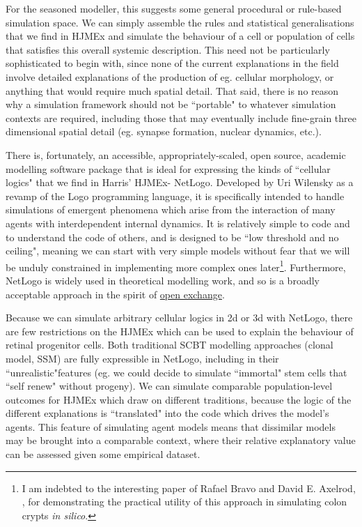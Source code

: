 For the seasoned modeller, this suggests some general procedural or rule-based simulation space. We can simply assemble the rules and statistical generalisations that we find in HJMEx and simulate the behaviour of a cell or population of cells that satisfies this overall systemic description. This need not be particularly sophisticated to begin with, since none of the current explanations in the field involve detailed explanations of the production of eg. cellular morphology, or anything that would require much spatial detail. That said, there is no reason why a simulation framework should not be ``portable" to whatever simulation contexts are required, including those that may eventually include fine-grain three dimensional spatial detail (eg. synapse formation, nuclear dynamics, etc.).

There is, fortunately, an accessible, appropriately-scaled, open source, academic modelling software package that is ideal for expressing the kinds of ``cellular logics" that we find in Harris' HJMEx- NetLogo. Developed by Uri Wilensky as a revamp of the Logo programming language, it is specifically intended to handle simulations of emergent phenomena which arise from the interaction of many agents with interdependent internal dynamics. It is relatively simple to code and to understand the code of others, and is designed to be ``low threshold and no ceiling", meaning we can start with very simple models without fear that we will be unduly constrained in implementing more complex ones later\footnote{I am indebted to the interesting paper of Rafael Bravo and David E. Axelrod, \cite{Bravo2013}, for demonstrating the practical utility of this approach in simulating colon crypts \textit{in silico}.}. Furthermore, NetLogo is widely used in theoretical modelling work, and so is a broadly acceptable approach in the spirit of \hyperref[openexchange]{open exchange}.

Because we can simulate arbitrary cellular logics in 2d or 3d with NetLogo, there are few restrictions on the HJMEx which can be used to explain the behaviour of retinal progenitor cells. Both traditional SCBT modelling approaches (clonal model, SSM) are fully expressible in NetLogo, including in their ``unrealistic"features (eg. we could decide to simulate ``immortal" stem cells that ``self renew" without progeny). We can simulate comparable population-level outcomes for HJMEx which draw on different traditions, because the logic of the different explanations is ``translated" into the code which drives the model's agents. This feature of simulating agent models means that dissimilar models may be brought into a comparable context, where their relative explanatory value can be assessed given some empirical dataset.


